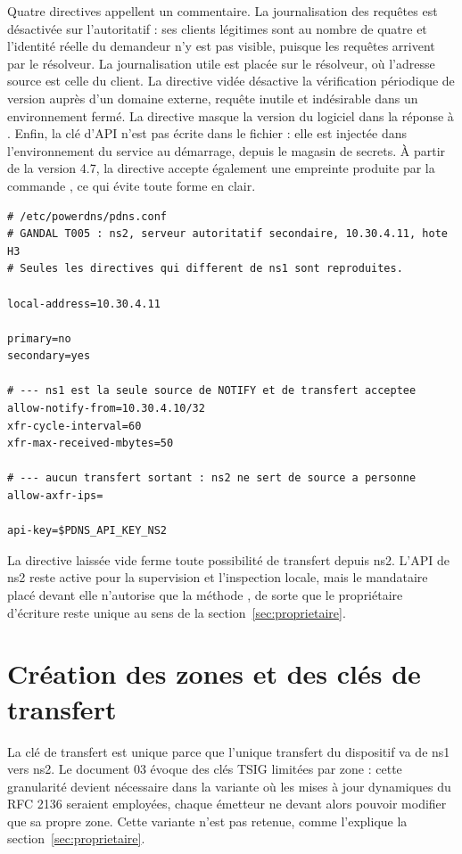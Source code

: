 Quatre directives appellent un commentaire. La journalisation des requêtes est
désactivée sur l'autoritatif : ses clients légitimes sont au nombre de quatre et
l'identité réelle du demandeur n'y est pas visible, puisque les requêtes
arrivent par le résolveur. La journalisation utile est placée sur le résolveur,
où l'adresse source est celle du client. La directive 
vidée désactive la vérification périodique de version auprès d'un domaine
externe, requête inutile et indésirable dans un environnement fermé. La
directive  masque la version du logiciel dans la réponse à
. Enfin, la clé d'API n'est pas écrite dans le fichier : elle
est injectée dans l'environnement du service au démarrage, depuis le magasin de
secrets. À partir de la version 4.7, la directive  accepte également
une empreinte produite par la commande , ce qui évite
toute forme en clair.

\begin{lstlisting}[language=pdnsconf,caption={Écarts de configuration du serveur
  autoritatif secondaire ns2},label=lst:ns2]
# /etc/powerdns/pdns.conf
# GANDAL T005 : ns2, serveur autoritatif secondaire, 10.30.4.11, hote H3
# Seules les directives qui different de ns1 sont reproduites.

local-address=10.30.4.11

primary=no
secondary=yes

# --- ns1 est la seule source de NOTIFY et de transfert acceptee
allow-notify-from=10.30.4.10/32
xfr-cycle-interval=60
xfr-max-received-mbytes=50

# --- aucun transfert sortant : ns2 ne sert de source a personne
allow-axfr-ips=

api-key=$PDNS_API_KEY_NS2
\end{lstlisting}

La directive  laissée vide ferme toute possibilité de
transfert depuis ns2. L'API de ns2 reste active pour la supervision et
l'inspection locale, mais le mandataire placé devant elle n'autorise que la
méthode , de sorte que le propriétaire d'écriture reste unique au sens
de la section~\ref{sec:proprietaire}.

\section{Création des zones et des clés de transfert}
\label{sec:zones}

La clé de transfert est unique parce que l'unique transfert du dispositif va de
ns1 vers ns2. Le document 03 évoque des clés TSIG limitées par zone : cette
granularité devient nécessaire dans la variante où les mises à jour dynamiques
du RFC 2136 seraient employées, chaque émetteur ne devant alors pouvoir modifier
que sa propre zone. Cette variante n'est pas retenue, comme l'explique la
section~\ref{sec:proprietaire}.

